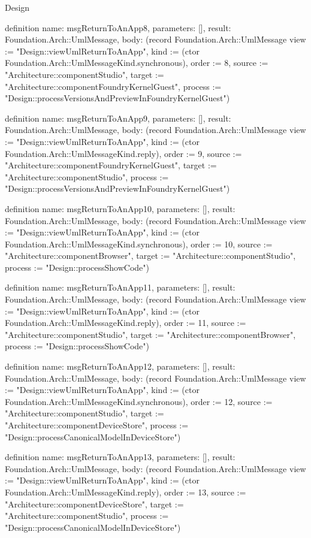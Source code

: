 \begin{lexlean}{Design}
\begin{semanticmodule}
definition{
  name: msgReturnToAnApp8,
  parameters: [],
  result: Foundation.Arch::UmlMessage,
  body: (record Foundation.Arch::UmlMessage {view := "Design::viewUmlReturnToAnApp", kind := (ctor Foundation.Arch::UmlMessageKind.synchronous), order := 8, source := "Architecture::componentStudio", target := "Architecture::componentFoundryKernelGuest", process := "Design::processVersionsAndPreviewInFoundryKernelGuest"})
}

definition{
  name: msgReturnToAnApp9,
  parameters: [],
  result: Foundation.Arch::UmlMessage,
  body: (record Foundation.Arch::UmlMessage {view := "Design::viewUmlReturnToAnApp", kind := (ctor Foundation.Arch::UmlMessageKind.reply), order := 9, source := "Architecture::componentFoundryKernelGuest", target := "Architecture::componentStudio", process := "Design::processVersionsAndPreviewInFoundryKernelGuest"})
}

definition{
  name: msgReturnToAnApp10,
  parameters: [],
  result: Foundation.Arch::UmlMessage,
  body: (record Foundation.Arch::UmlMessage {view := "Design::viewUmlReturnToAnApp", kind := (ctor Foundation.Arch::UmlMessageKind.synchronous), order := 10, source := "Architecture::componentBrowser", target := "Architecture::componentStudio", process := "Design::processShowCode"})
}

definition{
  name: msgReturnToAnApp11,
  parameters: [],
  result: Foundation.Arch::UmlMessage,
  body: (record Foundation.Arch::UmlMessage {view := "Design::viewUmlReturnToAnApp", kind := (ctor Foundation.Arch::UmlMessageKind.reply), order := 11, source := "Architecture::componentStudio", target := "Architecture::componentBrowser", process := "Design::processShowCode"})
}

definition{
  name: msgReturnToAnApp12,
  parameters: [],
  result: Foundation.Arch::UmlMessage,
  body: (record Foundation.Arch::UmlMessage {view := "Design::viewUmlReturnToAnApp", kind := (ctor Foundation.Arch::UmlMessageKind.synchronous), order := 12, source := "Architecture::componentStudio", target := "Architecture::componentDeviceStore", process := "Design::processCanonicalModelInDeviceStore"})
}

definition{
  name: msgReturnToAnApp13,
  parameters: [],
  result: Foundation.Arch::UmlMessage,
  body: (record Foundation.Arch::UmlMessage {view := "Design::viewUmlReturnToAnApp", kind := (ctor Foundation.Arch::UmlMessageKind.reply), order := 13, source := "Architecture::componentDeviceStore", target := "Architecture::componentStudio", process := "Design::processCanonicalModelInDeviceStore"})
}


\end{semanticmodule}
\end{lexlean}
